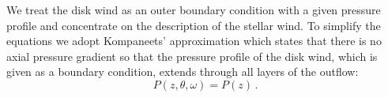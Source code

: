 We treat the disk wind as an outer boundary condition with a given pressure profile and concentrate on the description of the stellar wind. To simplify the equations we adopt Kompaneets' approximation \citep{1960SPhD....5...46K} which states that there is no axial pressure gradient so that the pressure profile of the disk wind, which is given as a boundary condition, extends through all layers of the outflow:
\begin{equation}
P(z,\theta, \omega) = P(z)\,.
\end{equation}

